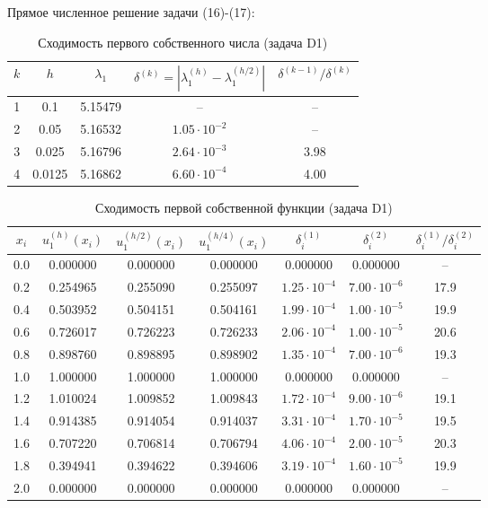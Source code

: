 \documentclass[a4paper,12pt]{article}
\begin{document}
	\quad Прямое численное решение задачи (16)-(17):
	
	\begin{table}[H]
		\centering
		\caption{Сходимость первого собственного числа (задача D1)}
		\label{tab:eigen_d1_lambda}
		\begin{tabular}{|c|c|c|c|c|}
			\hline
			$k$ & $h$ & $\lambda_1$ & $\delta^{(k)} = |\lambda_1^{(h)} - \lambda_1^{(h/2)}|$ & $\delta^{(k-1)} / \delta^{(k)}$ \\
			\hline
			1 & 0.1    & 5.15479 & -- & -- \\
			2 & 0.05   & 5.16532 & $1.05 \cdot 10^{-2}$ & -- \\
			3 & 0.025  & 5.16796 & $2.64 \cdot 10^{-3}$ & 3.98 \\
			4 & 0.0125 & 5.16862 & $6.60 \cdot 10^{-4}$ & 4.00 \\
			\hline
		\end{tabular}
	\end{table}
	
	\begin{table}[H]
		\centering
		\caption{Сходимость первой собственной функции (задача D1)}
		\label{tab:eigen_d1_u1}
		\begin{tabular}{|c|c|c|c|c|c|c|}
			\hline
			$x_i$ & $u_1^{(h)}(x_i)$ & $u_1^{(h/2)}(x_i)$ & $u_1^{(h/4)}(x_i)$ & $\delta_i^{(1)}$ & $\delta_i^{(2)}$ & $\delta_i^{(1)} / \delta_i^{(2)}$ \\
			\hline
			0.0 & 0.000000 & 0.000000 & 0.000000 & 0.000000 & 0.000000 & -- \\
			0.2 & 0.254965 & 0.255090 & 0.255097 & $1.25\cdot10^{-4}$ & $7.00\cdot10^{-6}$ & 17.9 \\
			0.4 & 0.503952 & 0.504151 & 0.504161 & $1.99\cdot10^{-4}$ & $1.00\cdot10^{-5}$ & 19.9 \\
			0.6 & 0.726017 & 0.726223 & 0.726233 & $2.06\cdot10^{-4}$ & $1.00\cdot10^{-5}$ & 20.6 \\
			0.8 & 0.898760 & 0.898895 & 0.898902 & $1.35\cdot10^{-4}$ & $7.00\cdot10^{-6}$ & 19.3 \\
			1.0 & 1.000000 & 1.000000 & 1.000000 & 0.000000 & 0.000000 & -- \\
			1.2 & 1.010024 & 1.009852 & 1.009843 & $1.72\cdot10^{-4}$ & $9.00\cdot10^{-6}$ & 19.1 \\
			1.4 & 0.914385 & 0.914054 & 0.914037 & $3.31\cdot10^{-4}$ & $1.70\cdot10^{-5}$ & 19.5 \\
			1.6 & 0.707220 & 0.706814 & 0.706794 & $4.06\cdot10^{-4}$ & $2.00\cdot10^{-5}$ & 20.3 \\
			1.8 & 0.394941 & 0.394622 & 0.394606 & $3.19\cdot10^{-4}$ & $1.60\cdot10^{-5}$ & 19.9 \\
			2.0 & 0.000000 & 0.000000 & 0.000000 & 0.000000 & 0.000000 & -- \\
			\hline
		\end{tabular}
	\end{table}
		
\end{document}
